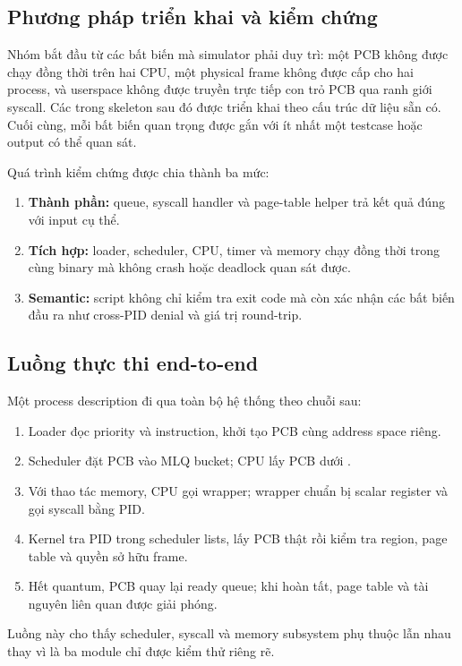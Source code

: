 \documentclass[12pt,a4paper]{article}
\newcommand{\code}[1]{\texttt{\detokenize{#1}}}
\begin{document}
\subsection{Phương pháp triển khai và kiểm chứng}
Nhóm bắt đầu từ các bất biến mà simulator phải duy trì: một PCB không được chạy đồng
thời trên hai CPU, một physical frame không được cấp cho hai process, và userspace
không được truyền trực tiếp con trỏ PCB qua ranh giới syscall. Các \code{TODO} trong
skeleton sau đó được triển khai theo cấu trúc dữ liệu sẵn có. Cuối cùng, mỗi bất biến
quan trọng được gắn với ít nhất một testcase hoặc output có thể quan sát.

Quá trình kiểm chứng được chia thành ba mức:
\begin{enumerate}
  \item \textbf{Thành phần:} queue, syscall handler và page-table helper trả kết quả
        đúng với input cụ thể.
  \item \textbf{Tích hợp:} loader, scheduler, CPU, timer và memory chạy đồng thời trong
        cùng binary mà không crash hoặc deadlock quan sát được.
  \item \textbf{Semantic:} script không chỉ kiểm tra exit code mà còn xác nhận các
        bất biến đầu ra như cross-PID denial và giá trị round-trip.
\end{enumerate}

\subsection{Luồng thực thi end-to-end}
Một process description đi qua toàn bộ hệ thống theo chuỗi sau:
\begin{enumerate}
  \item Loader đọc priority và instruction, khởi tạo PCB cùng address space riêng.
  \item Scheduler đặt PCB vào MLQ bucket; CPU lấy PCB dưới \code{queue_lock}.
  \item Với thao tác memory, CPU gọi wrapper; wrapper chuẩn bị scalar register và gọi
        syscall bằng PID.
  \item Kernel tra PID trong scheduler lists, lấy PCB thật rồi kiểm tra region, page
        table và quyền sở hữu frame.
  \item Hết quantum, PCB quay lại ready queue; khi hoàn tất, page table và tài nguyên
        liên quan được giải phóng.
\end{enumerate}
Luồng này cho thấy scheduler, syscall và memory subsystem phụ thuộc lẫn nhau thay vì là
ba module chỉ được kiểm thử riêng rẽ.
\end{document}
